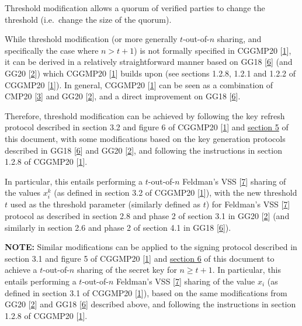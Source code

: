 \documentclass[
]{article}
\begin{document}
Threshold modification allows a quorum of verified parties to change the
threshold (i.e.~change the size of the quorum).

While threshold modification (or more generally \(t\)-out-of-\(n\)
sharing, and specifically the case where \(n > t+1\)) is not formally
specified in CGGMP20 {[}\protect\hyperlink{ref-cggmp20}{1}{]}, it can be
derived in a relatively straightforward manner based on GG18
{[}\protect\hyperlink{ref-gg18}{6}{]} (and GG20
{[}\protect\hyperlink{ref-gg20}{2}{]}) which CGGMP20
{[}\protect\hyperlink{ref-cggmp20}{1}{]} builds upon (see sections
1.2.8, 1.2.1 and 1.2.2 of CGGMP20
{[}\protect\hyperlink{ref-cggmp20}{1}{]}). In general, CGGMP20
{[}\protect\hyperlink{ref-cggmp20}{1}{]} can be seen as a combination of
CMP20 {[}\protect\hyperlink{ref-cmp20}{3}{]} and GG20
{[}\protect\hyperlink{ref-gg20}{2}{]}, and a direct improvement on GG18
{[}\protect\hyperlink{ref-gg18}{6}{]}.

Therefore, threshold modification can be achieved by following the key
refresh protocol described in section 3.2 and figure 6 of CGGMP20
{[}\protect\hyperlink{ref-cggmp20}{1}{]} and
\protect\hyperlink{key-refresh}{section 5} of this document, with some
modifications based on the key generation protocols described in GG18
{[}\protect\hyperlink{ref-gg18}{6}{]} and GG20
{[}\protect\hyperlink{ref-gg20}{2}{]}, and following the instructions in
section 1.2.8 of CGGMP20 {[}\protect\hyperlink{ref-cggmp20}{1}{]}.

In particular, this entails performing a \(t\)-out-of-\(n\) Feldman's
VSS {[}\protect\hyperlink{ref-feldman-vss}{7}{]} sharing of the values
\(x_i^k\) (as defined in section 3.2 of CGGMP20
{[}\protect\hyperlink{ref-cggmp20}{1}{]}), with the new threshold \(t\)
used as the threshold parameter (similarly defined as \(t\)) for
Feldman's VSS {[}\protect\hyperlink{ref-feldman-vss}{7}{]} protocol as
described in section 2.8 and phase 2 of section 3.1 in GG20
{[}\protect\hyperlink{ref-gg20}{2}{]} (and similarly in section 2.6 and
phase 2 of section 4.1 in GG18 {[}\protect\hyperlink{ref-gg18}{6}{]}).

\textbf{NOTE:} Similar modifications can be applied to the signing
protocol described in section 3.1 and figure 5 of CGGMP20
{[}\protect\hyperlink{ref-cggmp20}{1}{]} and
\protect\hyperlink{signing}{section 6} of this document to achieve a
\(t\)-out-of-\(n\) sharing of the secret key for \(n \geq t+1\). In
particular, this entails performing a \(t\)-out-of-\(n\) Feldman's VSS
{[}\protect\hyperlink{ref-feldman-vss}{7}{]} sharing of the value
\(x_i\) (as defined in section 3.1 of CGGMP20
{[}\protect\hyperlink{ref-cggmp20}{1}{]}), based on the same
modifications from GG20 {[}\protect\hyperlink{ref-gg20}{2}{]} and GG18
{[}\protect\hyperlink{ref-gg18}{6}{]} described above, and following the
instructions in section 1.2.8 of CGGMP20
{[}\protect\hyperlink{ref-cggmp20}{1}{]}.
\end{document}
